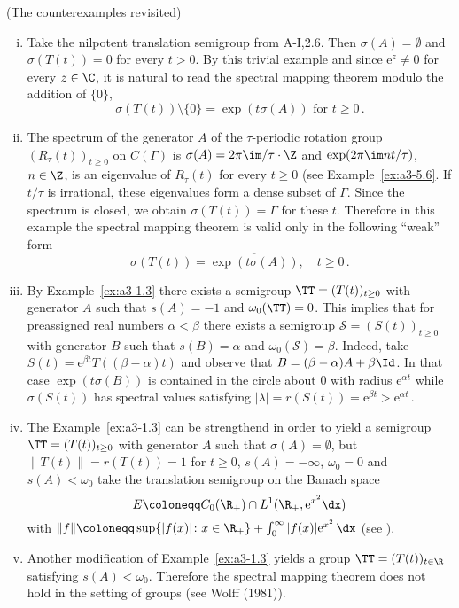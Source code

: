 \begin{example}{(The counterexamples revisited)}
	\label{ex:a3-6.1}
\begin{enumerate}[(i), wide]
\item
Take the nilpotent translation semigroup from A-I,2.6. Then $\sigma(A) = \emptyset$ and $\sigma(T(t)) = 0$ for every $t > 0$.
By this trivial example and since $\mathrm{e}^{z} \neq 0$ for every $z \in \C$, it is natural to read the spectral mapping theorem modulo the addition of $\{0\}$, \ie 
\[
\sigma(T(t)) \setminus \{0\} = \exp(t\sigma(A))  \text{ for } t \geq 0\,.
\]
\item
The spectrum of the generator $A$ of the $\tau$-periodic rotation group $(R_{\tau}(t))_{t \geq 0}$ on $C(\Gamma)$ is $\sigma(A) = 2\pi\im /\tau\cdot\Z$ and $\exp(2\pi\im nt/\tau)$, $n \in \Z$, is an eigenvalue of $R_{\tau}(t)$ for every $t \geq 0$ (see Example~\ref{ex:a3-5.6}.
If $t/\tau$ is irrational, these eigenvalues form a dense subset of $\Gamma$.
Since the spectrum is closed, we obtain $\sigma(T(t)) = \Gamma$ for these $t$.
Therefore in this example the spectral mapping theorem is valid only in the following \enquote{weak} form
\[
\sigma(T(t)) = \overline{\exp(t\sigma(A))}, \quad t \geq 0\,.
\]

\item 
By Example~\ref{ex:a3-1.3} there exists a semigroup $\TT = (T(t))_{t \geq 0}$ with generator $A$ such that $s(A) = -1$ and $\omega_{0}(\TT) = 0$.
This implies that for preassigned real numbers $\alpha < \beta$ there exists a semigroup $\mathcal{S} = (S(t))_{t \geq 0}$ with generator $B$ such that $s(B) = \alpha$ and $\omega_{0}(\mathcal{S}) = \beta$. Indeed, take $S(t) = \mathrm{e}^{\beta t}T((\beta - \alpha)t)$ and observe that $B = (\beta-\alpha)A + \beta\Id$. 
In that case $\exp(t\sigma(B))$ is contained in the circle about $0$ with radius $\mathrm{e}^{\alpha t}$ 
while $\sigma(S(t))$ has spectral values satisfying $|\lambda| = r(S(t)) = \mathrm{e}^{\beta t} > \mathrm{e}^{\alpha t}$\,.


\item 
The Example~\ref{ex:a3-1.3} can be strengthend in order to yield a semigroup $\TT = (T(t))_{t \geq 0}$ with generator $A$ such that $\sigma(A) = \emptyset$, but $\|T(t)\| = r(T(t)) = 1$ for $t \geq 0$, \ie $s(A) = -\infty$, $\omega_{0} = 0$ and $s(A) < \omega_{0}$ 
take the translation semigroup on the Banach space
\[
E \coloneqq C_{0}(\R_{+}) \cap L^{1}(\R_{+}, \mathrm{e}^{x^{2}}\dx)
\]
with $\|f\| \coloneqq \sup \{|f(x)| \colon x \in \R_{+}\} + \int_{0}^{\infty} |f(x)|\mathrm{e}^{x^{2}} \, \dx$ (see \citet{greinervoigtwolff:1981}).

\item 
Another modification of Example~\ref{ex:a3-1.3} yields a group $\TT = (T(t))_{t \in \R}$ satisfying $s(A) < \omega_{0}$.
Therefore the spectral mapping theorem does not hold in the setting of groups (see Wolff (1981)).
\end{enumerate}
\end{example}
